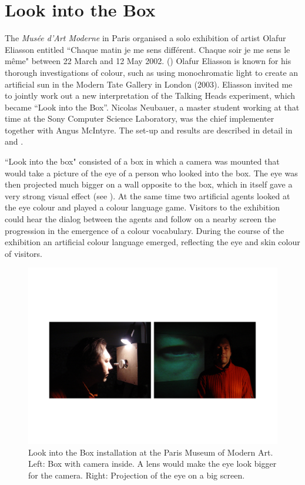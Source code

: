 \section{Look into the Box} 

The {\itshape Mus\'ee d'Art Moderne} in Paris organised a solo exhibition of artist Olafur Eliasson entitled 
``Chaque matin je me sens diff\'erent. Chaque soir je me sens le m\^eme" between 
22 March and 12 May 2002. (\citealt{Scherf:2002}) Olafur Eliasson is known for his thorough 
investigations of colour, such as using monochromatic light to create an artificial sun in the Modern Tate
Gallery in London (2003). Eliasson invited me to jointly work out a new interpretation of the 
Talking Heads experiment, which became ``Look into the Box''. Nicolas Neubauer, a master student working at 
that time at the Sony Computer Science Laboratory, was the chief implementer together with Angus McIntyre.  
The set-up and results are described in detail in \cite{Steels:2004} and \cite{Neubauer:2004}.

``Look into the box" consisted of a box in which a camera was mounted that would take a picture of the 
eye of a person who looked into the box. The eye was then projected much bigger on a wall opposite to the box, 
which in itself gave a very strong visual effect (see ). 
At the same time two artificial agents looked at the 
eye colour and played a colour language game. Visitors to the exhibition could hear the dialog between the agents 
and follow on a nearby screen the progression in the emergence of a colour vocabulary. During the course of the 
exhibition an artificial colour language emerged, reflecting the eye and skin colour of visitors. 

\begin{figure}[htbp]
  \centerline{\includegraphics[width=.95\textwidth]{chap9/figs/look-into-box.pdf}}
\caption{\label{fig:lookintobox}Look into the Box installation at the Paris Museum of Modern Art. Left: Box with camera inside. A lens would make 
the eye look bigger for the camera. Right: Projection of the eye on a big screen.}
\end{figure}

